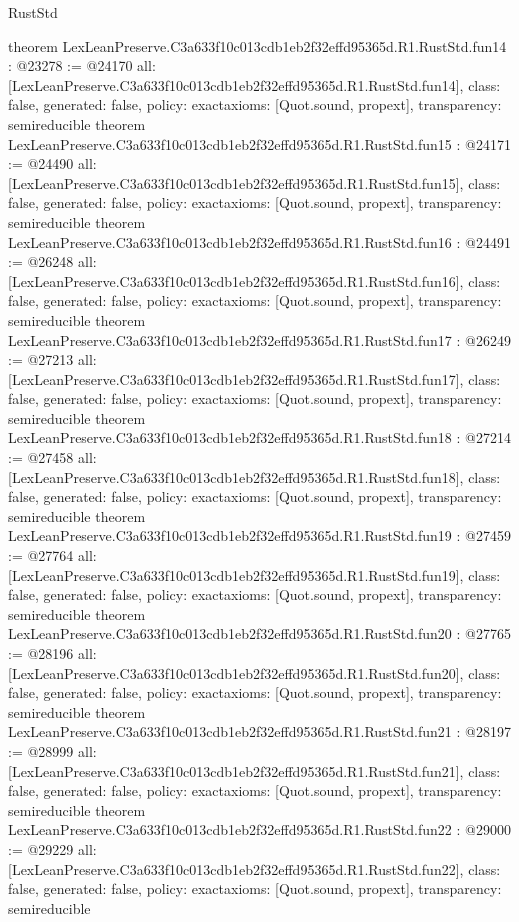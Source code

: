 \begin{lexlean}{RustStd}
\begin{coremodule}
{}
theorem LexLeanPreserve.C3a633f10c013cdb1eb2f32effd95365d.R1.RustStd.fun14 : @23278 := @24170 {
  all: [LexLeanPreserve.C3a633f10c013cdb1eb2f32effd95365d.R1.RustStd.fun14],
  class: false,
  generated: false,
  policy: exact{axioms: [Quot.sound, propext]},
  transparency: semireducible
}
theorem LexLeanPreserve.C3a633f10c013cdb1eb2f32effd95365d.R1.RustStd.fun15 : @24171 := @24490 {
  all: [LexLeanPreserve.C3a633f10c013cdb1eb2f32effd95365d.R1.RustStd.fun15],
  class: false,
  generated: false,
  policy: exact{axioms: [Quot.sound, propext]},
  transparency: semireducible
}
theorem LexLeanPreserve.C3a633f10c013cdb1eb2f32effd95365d.R1.RustStd.fun16 : @24491 := @26248 {
  all: [LexLeanPreserve.C3a633f10c013cdb1eb2f32effd95365d.R1.RustStd.fun16],
  class: false,
  generated: false,
  policy: exact{axioms: [Quot.sound, propext]},
  transparency: semireducible
}
theorem LexLeanPreserve.C3a633f10c013cdb1eb2f32effd95365d.R1.RustStd.fun17 : @26249 := @27213 {
  all: [LexLeanPreserve.C3a633f10c013cdb1eb2f32effd95365d.R1.RustStd.fun17],
  class: false,
  generated: false,
  policy: exact{axioms: [Quot.sound, propext]},
  transparency: semireducible
}
theorem LexLeanPreserve.C3a633f10c013cdb1eb2f32effd95365d.R1.RustStd.fun18 : @27214 := @27458 {
  all: [LexLeanPreserve.C3a633f10c013cdb1eb2f32effd95365d.R1.RustStd.fun18],
  class: false,
  generated: false,
  policy: exact{axioms: [Quot.sound, propext]},
  transparency: semireducible
}
theorem LexLeanPreserve.C3a633f10c013cdb1eb2f32effd95365d.R1.RustStd.fun19 : @27459 := @27764 {
  all: [LexLeanPreserve.C3a633f10c013cdb1eb2f32effd95365d.R1.RustStd.fun19],
  class: false,
  generated: false,
  policy: exact{axioms: [Quot.sound, propext]},
  transparency: semireducible
}
theorem LexLeanPreserve.C3a633f10c013cdb1eb2f32effd95365d.R1.RustStd.fun20 : @27765 := @28196 {
  all: [LexLeanPreserve.C3a633f10c013cdb1eb2f32effd95365d.R1.RustStd.fun20],
  class: false,
  generated: false,
  policy: exact{axioms: [Quot.sound, propext]},
  transparency: semireducible
}
theorem LexLeanPreserve.C3a633f10c013cdb1eb2f32effd95365d.R1.RustStd.fun21 : @28197 := @28999 {
  all: [LexLeanPreserve.C3a633f10c013cdb1eb2f32effd95365d.R1.RustStd.fun21],
  class: false,
  generated: false,
  policy: exact{axioms: [Quot.sound, propext]},
  transparency: semireducible
}
theorem LexLeanPreserve.C3a633f10c013cdb1eb2f32effd95365d.R1.RustStd.fun22 : @29000 := @29229 {
  all: [LexLeanPreserve.C3a633f10c013cdb1eb2f32effd95365d.R1.RustStd.fun22],
  class: false,
  generated: false,
  policy: exact{axioms: [Quot.sound, propext]},
  transparency: semireducible
}
\end{coremodule}
\end{lexlean}
